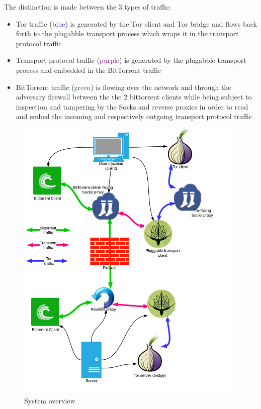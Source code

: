 \documentclass[11pt]{book} %
\begin{document}
The distinction is made between the 3 types of traffic:

\begin{itemize}
\item Tor traffic (\textcolor{blue}{blue}) is generated by the Tor client and Tor bridge and flows back forth to the plugabble transport process which wraps it in the transport protocol traffic 
\item Transport protocol traffic (\textcolor{purple}{purple}) is generated by the plugabble transport process and embedded in the BitTorrent traffic
\item  BitTorrent traffic (\textcolor{green}{green}) is flowing over the network and through the adversary firewall between the the 2 bittorrent clients while being subject to inspection and tampering by the Socks and reverse proxies in order to read and embed the incoming and respectively outgoing transport protocol traffic 
\end{itemize}

\begin{figure}[h!]
\begin{center}
\includegraphics[scale=0.23]{FuinSystemArchitecture}
\end{center}
 \caption{System overview}
 \label{fig:system_architecture}
 \end{figure}
\end{document}
